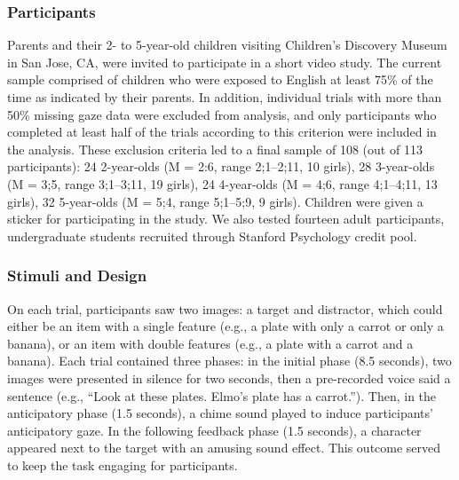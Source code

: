 \documentclass[10pt,letterpaper]{article}
\begin{document}
\subsubsection{Participants}

Parents and their 2- to 5-year-old children visiting Children's Discovery Museum in San Jose, CA, were invited to participate in a short video study. The current sample comprised of children who were exposed to English at least 75\% of the time as indicated by their parents. In addition, individual trials with more than 50\% missing gaze data were excluded from analysis, and only participants who completed at least half of the trials according to this criterion were included in the analysis. These exclusion criteria led to a final sample of 108 (out of 113 participants): 24 2-year-olds (M = 2:6, range 2;1--2;11, 10 girls), 28 3-year-olds (M = 3;5, range 3;1--3;11, 19 girls), 24 4-year-olds (M = 4;6, range 4;1--4;11, 13 girls), 32 5-year-olds (M = 5;4, range 5;1--5;9, 9 girls). Children were given a sticker for participating in the study. We also tested fourteen adult participants, undergraduate students recruited through Stanford Psychology credit pool. 

\subsubsection{Stimuli and Design}

On each trial, participants saw two images: a target and distractor, which could either be an item with a single feature (e.g., a plate with only a carrot or only a banana), or an item with double features (e.g., a plate with a carrot and a banana). Each trial contained three phases: in the initial phase (8.5 seconds), two images were presented in silence for two seconds, then a pre-recorded voice said a sentence (e.g., ``Look at these plates. Elmo's plate has a carrot.''). Then, in the anticipatory phase (1.5 seconds), a chime sound played to induce participants' anticipatory gaze. In the following feedback phase (1.5 seconds), a character appeared next to the target with an amusing sound effect. This outcome served to keep the task engaging for participants.
\end{document}
